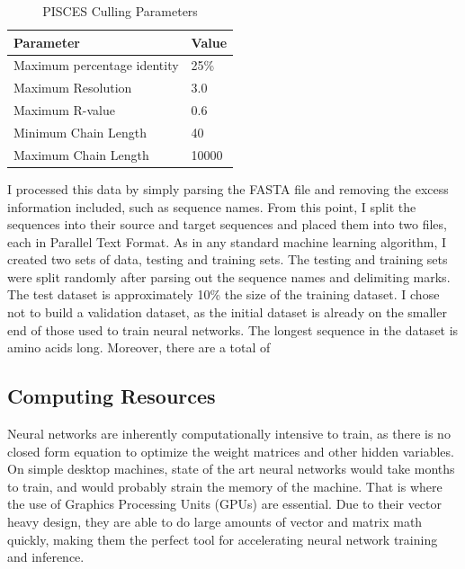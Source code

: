 \documentclass[pageno]{jpaper}
\begin{document}
\begin{table}[H]
	\centering
	\caption{PISCES Culling Parameters}
	\label{tb:cull}
	\begin{tabular}{|l|l|}
		\hline
		\textbf{Parameter}          & \textbf{Value} \\ \hline
		Maximum percentage identity & 25\%           \\ \hline
		Maximum Resolution          & 3.0            \\ \hline
		Maximum R-value             & 0.6            \\ \hline
		Minimum Chain Length        & 40             \\ \hline
		Maximum Chain Length        & 10000          \\ \hline
	\end{tabular}
\end{table}

\par
I processed this data by simply parsing the FASTA file and removing the excess information included, such as sequence names.  From this point, I split the sequences into their source and target sequences and placed them into two files, each in Parallel Text Format.  As in any standard machine learning algorithm, I created two sets of data, testing and training sets.  The testing and training sets were split randomly after parsing out the sequence names and delimiting marks.  The test dataset is approximately 10\% the size of the training dataset.  I chose not to build a validation dataset, as the initial dataset is already on the smaller end of those used to train neural networks.  The longest sequence in the dataset is  amino acids long.  Moreover, there are a total of 

\subsection{Computing Resources}
Neural networks are inherently computationally intensive to train, as there is no closed form equation to optimize the weight matrices and other hidden variables.  On simple desktop machines, state of the art neural networks would take months to train, and would probably strain the memory of the machine.  That is where the use of Graphics Processing Units (GPUs) are essential.  Due to their vector heavy design, they are able to do large amounts of vector and matrix math quickly, making them the perfect tool for accelerating neural network training and inference.
\end{document}
